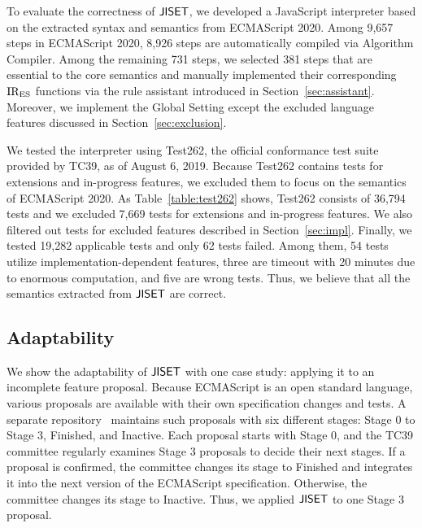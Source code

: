 To evaluate the correctness of \( \text{\sf JISET} \), we developed a JavaScript
interpreter based on the extracted syntax and semantics from
ECMAScript 2020.  Among 9,657 steps in ECMAScript 2020,
8,926 steps are automatically compiled via \textsf{Algorithm Compiler}.
Among the remaining 731 steps, we selected 381 steps
that are essential to the core semantics and manually
implemented their corresponding \( \text{IR}_\text{ES} \) functions
via the rule assistant introduced in Section~\ref{sec:assistant}.
Moreover, we implement the \textsf{Global Setting} except
the excluded language features discussed in Section~\ref{sec:exclusion}.

We tested the interpreter using Test262, the official conformance test
suite provided by TC39, as of August 6, 2019.  Because Test262
contains tests for extensions and in-progress features, we excluded
them to focus on the semantics of ECMAScript 2020.  As Table~\ref{table:test262} shows,
Test262 consists of 36,794 tests and we excluded 7,669 tests for
extensions and in-progress features.  We also filtered out
tests for excluded features described in Section~\ref{sec:impl}.
Finally, we tested 19,282 applicable tests and only 62 tests failed.
Among them, 54 tests utilize implementation-dependent features,
three are timeout with 20 minutes due to enormous computation,
and five are wrong tests.  Thus, we believe that all the
semantics extracted from \( \text{\sf JISET} \) are correct.


\subsection{Adaptability}
We show the adaptability of \( \text{\sf JISET} \) with one case study: applying
it to an incomplete feature proposal.  Because ECMAScript is an open
standard language, various proposals are available with their own
specification changes and tests.  A
separate repository~\cite{proposals} maintains such proposals with six
different stages: Stage 0 to Stage 3, Finished, and Inactive.  Each
proposal starts with Stage 0, and the TC39 committee regularly
examines Stage 3 proposals to decide their next stages.  If a proposal
is confirmed, the committee changes its stage to Finished and
integrates it into the next version of the ECMAScript specification.
Otherwise, the committee changes its stage to Inactive.  Thus, we
applied \( \text{\sf JISET} \) to one Stage 3 proposal.


